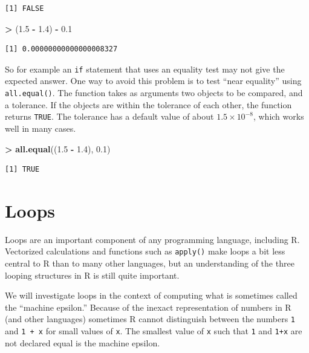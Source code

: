 \documentclass[
]{krantz}
\makeatletter
\newenvironment{Shaded}{\begin{snugshade}}{\end{snugshade}}
\newcommand{\FloatTok}[1]{\textcolor[rgb]{0.06,0.06,0.06}{#1}}
\newcommand{\KeywordTok}[1]{\textcolor[rgb]{0.27,0.27,0.27}{\textbf{#1}}}
\newcommand{\NormalTok}[1]{#1}
\newcommand{\OperatorTok}[1]{\textcolor[rgb]{0.43,0.43,0.43}{\textbf{#1}}}
\newcommand{\StringTok}[1]{\textcolor[rgb]{0.5,0.5,0.5}{#1}}
\newenvironment{kframe}{%
\medskip{}
\setlength{\fboxsep}{.8em}
 \def\at@end@of@kframe{}%
 \ifinner\ifhmode%
  \def\at@end@of@kframe{\end{minipage}}%
  \begin{minipage}{\columnwidth}%
 \fi\fi%
 \def\FrameCommand##1{\hskip\@totalleftmargin \hskip-\fboxsep
 \colorbox{shadecolor}{##1}\hskip-\fboxsep
     \hskip-\linewidth \hskip-\@totalleftmargin \hskip\columnwidth}%
 \MakeFramed {\advance\hsize-\width
   \@totalleftmargin\z@ \linewidth\hsize
   \@setminipage}}%
 {\par\unskip\endMakeFramed%
 \at@end@of@kframe}
\renewenvironment{Shaded}{\begin{kframe}}{\end{kframe}}
\makeatother
\begin{document}
\begin{verbatim}
[1] FALSE
\end{verbatim}

\begin{Shaded}
\begin{Highlighting}[]
\OperatorTok{\textgreater{}}\StringTok{ }\NormalTok{(}\FloatTok{1.5} \OperatorTok{{-}}\StringTok{ }\FloatTok{1.4}\NormalTok{) }\OperatorTok{{-}}\StringTok{ }\FloatTok{0.1}
\end{Highlighting}
\end{Shaded}

\begin{verbatim}
[1] 0.00000000000000008327
\end{verbatim}

So for example an \texttt{if} statement that uses an equality test may not give the expected answer. One way to avoid this problem is to test ``near equality'' using \texttt{all.equal()}. The function takes as arguments two objects to be compared, and a tolerance. If the objects are within the tolerance of each other, the function returns \texttt{TRUE}. The tolerance has a default value of about \(1.5\times 10^{-8}\), which works well in many cases.

\begin{Shaded}
\begin{Highlighting}[]
\OperatorTok{\textgreater{}}\StringTok{ }\KeywordTok{all.equal}\NormalTok{((}\FloatTok{1.5} \OperatorTok{{-}}\StringTok{ }\FloatTok{1.4}\NormalTok{), }\FloatTok{0.1}\NormalTok{)}
\end{Highlighting}
\end{Shaded}

\begin{verbatim}
[1] TRUE
\end{verbatim}

\hypertarget{loops}{%
\section{Loops}\label{loops}}

Loops are an important component of any programming language, including R. Vectorized calculations and functions such as \texttt{apply()} make loops a bit less central to R than to many other languages, but an understanding of the three looping structures in R is still quite important.

We will investigate loops in the context of computing what is sometimes called the ``machine epsilon.'' Because of the inexact representation of numbers in R (and other languages) sometimes R cannot distinguish between the numbers \texttt{1} and \texttt{\textbar{}1\ +\ x\textbar{}} for small values of \texttt{x}. The smallest value of \texttt{x} such that \texttt{1} and \texttt{\textbar{}1+x\textbar{}} are not declared equal is the machine epsilon.
\end{document}

